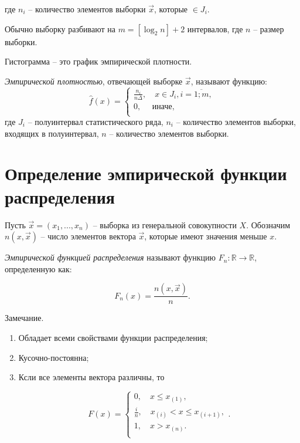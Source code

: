\documentclass[12pt]{report}
\begin{document}
где $n_i$ -- количество элементов выборки $\vec x$, которые $\in J_i$.

Обычно выборку разбивают на $m=[\log_2n]+2$ интервалов, где $n$ -- размер выборки.

Гистограмма -- это график эмпирической плотности. 

\textit{Эмпирической плотностью}, отвечающей выборке $\vec x$, называют функцию:
\begin{equation}
    \hat f(x) =
    \begin{cases}
        \displaystyle\frac{n_i}{n \Delta}, \quad x \in J_i, i = \overline{1; m}, \\
        0, \quad \text{ иначе,} \\
    \end{cases}
\end{equation}
где $J_i$ -- полуинтервал статистического ряда, $n_i$ -- количество элементов выборки, входящих в полуинтервал, $n$ -- количество элементов выборки.


\section{Определение эмпирической функции распределения}

Пусть $\vec x = (x_1, ..., x_n)$ -- выборка из генеральной совокупности $X$. Обозначим $n(x, \vec x)$ -- число элементов вектора $\vec x$, которые имеют значения меньше $x$.

\textit{Эмпирической функцией распределения} называют функцию $F_n: \mathbb{R} \to \mathbb{R}$, определенную как: 

\begin{equation}
    F_n(x) = \frac{n(x, \vec x)}{n}.
\end{equation}

Замечание. 
\begin{enumerate}
    \item  Обладает всеми свойствами функции распределения; 
    \item  Кусочно-постоянна;
    \item Ксли все элементы вектора различны, то
    
    \begin{equation}
    F(x) =
    \begin{cases}
    0, \quad x \leq x_{(1)}, \\
        \displaystyle\frac{i}{n}, \quad x_{(i)} < x \leq  x_{(i+1)},\\
        1, \quad  x > x_{(n)}. \\
    \end{cases}.
\end{equation}
\end{enumerate}
\end{document}
